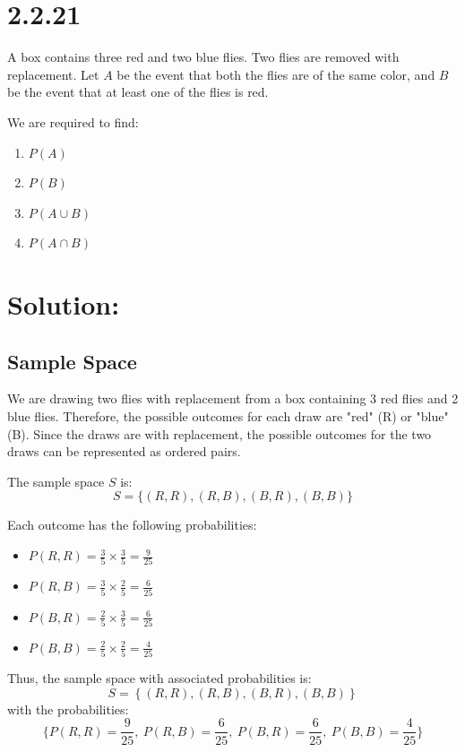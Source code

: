 \documentclass{article}
\begin{document}
\section*{2.2.21}

A box contains three red and two blue flies. Two flies are removed with replacement. Let \( A \) be the event that both the flies are of the same color, and \( B \) be the event that at least one of the flies is red. 

\noindent We are required to find:
\begin{enumerate}
    \item \( P(A) \)
    \item \( P(B) \)
    \item \( P(A \cup B) \)
    \item \( P(A \cap B) \)
\end{enumerate}

\section*{Solution:}

\subsection*{Sample Space}

We are drawing two flies with replacement from a box containing 3 red flies and 2 blue flies. Therefore, the possible outcomes for each draw are "red" (R) or "blue" (B). Since the draws are with replacement, the possible outcomes for the two draws can be represented as ordered pairs.

The sample space \( S \) is:
\[
S = \{ (R,R), (R,B), (B,R), (B,B) \}
\]

Each outcome has the following probabilities:
\begin{itemize}
    \item \( P(R,R) = \frac{3}{5} \times \frac{3}{5} = \frac{9}{25} \)
    \item \( P(R,B) = \frac{3}{5} \times \frac{2}{5} = \frac{6}{25} \)
    \item \( P(B,R) = \frac{2}{5} \times \frac{3}{5} = \frac{6}{25} \)
    \item \( P(B,B) = \frac{2}{5} \times \frac{2}{5} = \frac{4}{25} \)
\end{itemize}

Thus, the sample space with associated probabilities is:
\[
S = \left\{ (R,R), (R,B), (B,R), (B,B) \right\}
\]
with the probabilities:
\[
\{ P(R,R) = \frac{9}{25}, \ P(R,B) = \frac{6}{25}, \ P(B,R) = \frac{6}{25}, \ P(B,B) = \frac{4}{25} \}
\]
\end{document}
